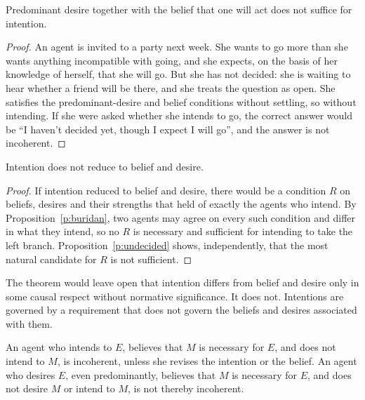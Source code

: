 \documentclass{situationist-preprint}
\begin{document}
\begin{proposition}\label{p:undecided}
Predominant desire together with the belief that one will act does not suffice for intention.
\end{proposition}

\begin{proof}
An agent is invited to a party next week. She wants to go more than she wants anything incompatible with going, and she expects, on the basis of her knowledge of herself, that she will go. But she has not decided: she is waiting to hear whether a friend will be there, and she treats the question as open. She satisfies the predominant-desire and belief conditions without settling, so without intending. If she were asked whether she intends to go, the correct answer would be \enquote{I haven't decided yet, though I expect I will go}, and the answer is not incoherent.
\end{proof}

\begin{theorem}\label{t:main}
Intention does not reduce to belief and desire.
\end{theorem}

\begin{proof}
If intention reduced to belief and desire, there would be a condition $R$ on beliefs, desires and their strengths that held of exactly the agents who intend. By Proposition~\ref{p:buridan}, two agents may agree on every such condition and differ in what they intend, so no $R$ is necessary and sufficient for intending to take the left branch. Proposition~\ref{p:undecided} shows, independently, that the most natural candidate for $R$ is not sufficient.
\end{proof}

The theorem would leave open that intention differs from belief and desire only in some causal respect without normative significance. It does not. Intentions are governed by a requirement that does not govern the beliefs and desires associated with them.

\begin{proposition}\label{p:means}
An agent who intends to $E$, believes that $M$ is necessary for $E$, and does not intend to $M$, is incoherent, unless she revises the intention or the belief. An agent who desires $E$, even predominantly, believes that $M$ is necessary for $E$, and does not desire $M$ or intend to $M$, is not thereby incoherent.
\end{proposition}
\end{document}
